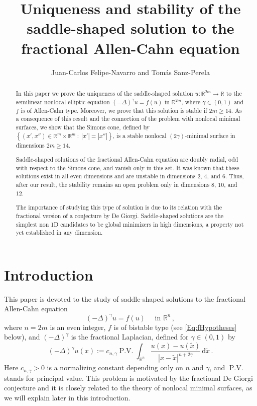 \documentclass[twoside,leqno,symbols-for-thanks, draft]{rmi}
\title[Saddle solution to the fractional Allen-Cahn equation]{Uniqueness and stability of the saddle-shaped solution to the fractional Allen-Cahn equation}
\author[J.C. Felipe-Navarro and T. Sanz-Perela]{Juan-Carlos Felipe-Navarro and Tom\'as Sanz-Perela}
\numberwithin{equation}{section}
\theoremstyle{definition}
\newcommand{\con}[1]{\mathbb{#1}}
\newcommand{\R}{\con{R}} %
\newcommand{\s}{\gamma}
\newcommand{\fraclaplacian}{(-\Delta)^\s}
\renewcommand{\d}{\,\mathrm{d}} %
\newcommand{\setcond}[2]{\left \{ #1 \ : \ #2  \right \}}
\DeclareMathOperator{\PV}{P.V.}
\begin{document}
%
%

\begin{abstract}
In this paper we prove the uniqueness of the saddle-shaped solution $u\colon \R^{2m} \to \R$ to the semilinear nonlocal elliptic equation $\fraclaplacian u = f(u)$ in $\R^{2m}$, where $\s \in (0,1)$ and $f$ is of Allen-Cahn type. Moreover, we prove that this solution is stable if $2m\geq 14$. As a consequence of this result and the connection of the problem with nonlocal minimal surfaces, we show that the Simons cone, defined by $\setcond{(x', x'') \in \R^{m}\times \R^m}{|x'| = |x''|}$, is a stable nonlocal $(2\s)$-minimal surface in dimensions $2m\geq 14$.

Saddle-shaped solutions of the fractional Allen-Cahn equation are doubly radial, odd with respect to the Simons cone, and vanish only in this set. It was known that these solutions exist in all even dimensions and are unstable in dimensions $2$, $4$, and $6$. Thus, after our result, the stability remains an open problem only in dimensions $8$, $10$, and $12$.

The importance of studying this type of solution is due to its relation with the fractional version of a conjecture by De Giorgi. Saddle-shaped solutions are the simplest non 1D candidates to be global minimizers in high dimensions, a property not yet established in any dimension.
\end{abstract}

%
%


\section{Introduction}

This paper is devoted to the study of saddle-shaped solutions to the fractional Allen-Cahn equation
\begin{equation}
\label{Eq:AllenCahn}
\fraclaplacian u = f(u)  \quad \text{ in } \R^{n}\,,
\end{equation}
where $n=2m$ is an even integer, $f$ is of bistable type (see \eqref{Eq:fHypotheses} below), and $\fraclaplacian$ is the fractional Laplacian, defined for $\s\in(0,1)$ by
$$
\fraclaplacian u (x):= c_{n,\s}  \PV \int_{\R^{n}} \dfrac{u(x) - u(\tilde{x})}{|x-\tilde{x}|^{n+2\s}} \d \tilde{x}\,.
$$
Here $c_{n,\s}>0$ is a normalizing constant depending only on $n$ and $\s$, and $\PV$ stands for principal value. This problem is motivated by the fractional De Giorgi conjecture and it is closely related to the theory of nonlocal minimal surfaces, as we will explain later in this introduction.
\end{document}
